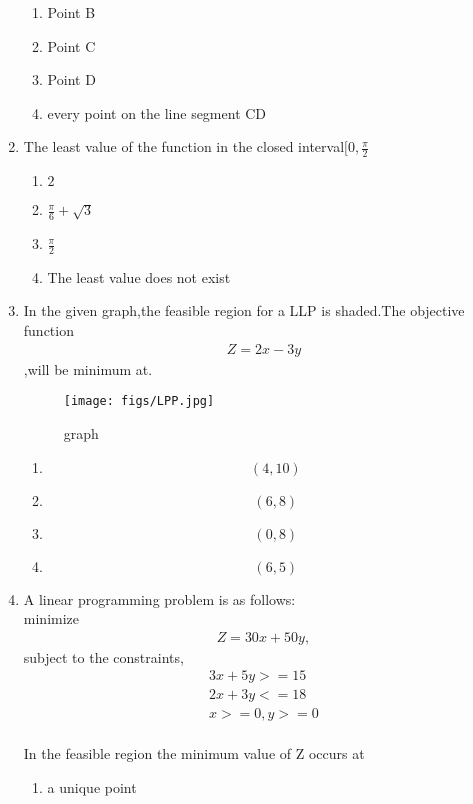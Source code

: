 \documentclass{article}
\begin{document}
\begin{enumerate}
		\begin{enumerate}[label=(\Alph*)]
			\item Point B
			\item Point C
			\item Point D
			\item every point on the line segment CD
		\end{enumerate}
	\item The least value of the function  in the closed interval$[0,\frac{\pi}{2}$
		\begin{enumerate}[label=(\Alph*)]
			\item $2$
			\item $\frac{\pi}{6}+\sqrt{3}$
			\item $\frac{\pi}{2}$
			\item The least value does not exist
		\end{enumerate}
	\item In the given graph,the feasible region for a LLP is shaded.The objective function 
	\begin{align}
		 Z = 2x-3y
	\end{align}
		,will be minimum at.
		\begin{figure}[H]
		\centering
			\texttt{[image: figs/LPP.jpg]}
			\caption{graph}
			\label{fig:LPP.jpg}
		\end{figure}
		\begin{enumerate}%
			\item $$(4,10)$$
			\item $$(6,8)$$
			\item $$(0,8)$$
			\item $$(6,5)$$
		\end{enumerate}
	\item A linear programming problem is as follows:
		\\
		minimize 
	\begin{align}
		  Z = 30x+50y,
	\end{align}
		subject to the constraints,
	\begin{align}
		  3x+5y>=15
		\\ 2x+3y<=18
		\\ x>=0,y>=0
	\end{align}
	\\	In the feasible region the minimum value of Z occurs at
		\\
		\begin{enumerate}[label = (\Alph*)]
			\item a unique point

\end{enumerate}
\end{enumerate}
\end{document}
